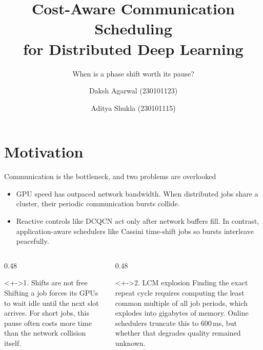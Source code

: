 \documentclass[aspectratio=169,11pt,c]{beamer}
\title{Cost-Aware Communication Scheduling\\for Distributed Deep Learning}
\subtitle{When is a phase shift worth its pause?}
\author{Daksh Agarwal (230101123) \and Aditya Shukla (230101115)}
\institute{BTP-1 Project Presentation}
\date{}
\begin{document}
\maketitle

\section{Motivation}

\begin{frame}{Communication is the bottleneck, and two problems are overlooked}
  \begin{itemize}[<+->]\small
    \item GPU speed has outpaced network bandwidth. When distributed jobs share a cluster, their periodic \alert{communication bursts collide}.
    \item Reactive controls like DCQCN act only after network buffers fill. In contrast, application-aware schedulers like Cassini \alert{time-shift} jobs so bursts interleave peacefully.
  \end{itemize}
  \vspace{0.3em}
  \begin{columns}[T]
    \begin{column}{0.48\textwidth}
      \begin{alertblock}<+->{1. Shifts are not free}
        \scriptsize Shifting a job forces its GPUs to wait idle until the next slot arrives. For short jobs, this pause often costs more time than the network collision itself.
      \end{alertblock}
    \end{column}
    \begin{column}{0.48\textwidth}
      \begin{block}<+->{2. LCM explosion}
        \scriptsize Finding the exact repeat cycle requires computing the least common multiple of all job periods, which explodes into gigabytes of memory. Online schedulers truncate this to 600\,ms, but whether that degrades quality remained unknown.
      \end{block}
    \end{column}
  \end{columns}
\end{frame}
\end{document}
